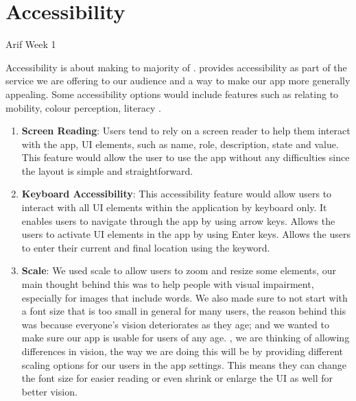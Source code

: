 \newpage

\section{Accessibility}
Arif Week 1

Accessibility is about making  to majority of .  provides accessibility as part of the service we are offering to our audience and a way to make our app more generally appealing. Some accessibility options would include features such as relating to mobility, colour perception,  literacy .

\begin{enumerate}
	\item \textbf{Screen Reading}:  Users tend to rely on a screen reader to help them interact with the app,  UI elements, such as name, role, description, state and value. This feature would allow the user to use the app without any difficulties since the layout is simple and straightforward. 

	\item \textbf{Keyboard Accessibility}: This accessibility feature would allow users to interact with all UI elements within the application by keyboard only. It enables users to navigate through the app by using arrow keys. Allows the users to activate UI elements in the app by using Enter keys. Allows the users to enter their current and final location using the keyword. 

	\item \textbf{Scale}:  We used scale to allow users to zoom and resize some elements, our main thought behind this was to help people with visual impairment, especially for images that include words. We also made sure to not start with a font size that is too small in general for many users, the reason behind this was because everyone’s vision deteriorates as they age; and we wanted to make sure our app is usable for users of any age. , we are thinking of allowing differences in vision, the way we are doing this will be by providing different scaling options for our users in the app settings. This means they can change the font size for easier reading or even shrink or enlarge the UI as well for better vision. 


\end{enumerate}
